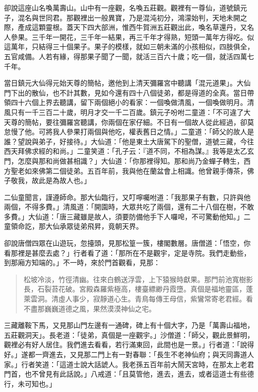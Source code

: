 卻說這座山名喚萬壽山。山中有一座觀，名喚五莊觀。觀裡有一尊仙，道號鎮元子，混名與世同君。那觀裡出一般異寶，乃是混沌初分，鴻濛始判，天地未開之際，產成這顆靈根。蓋天下四大部洲，惟西牛賀洲五莊觀出此，喚名草還丹，又名人參果。三千年一開花，三千年一結果，再三千年才得熟，短頭一萬年方得吃。似這萬年，只結得三十個果子。果子的模樣，就如三朝未滿的小孩相似，四肢俱全，五官咸備。人若有緣，得那果子聞了一聞，就活三百六十歲；吃一個，就活四萬七千年。

當日鎮元大仙得元始天尊的簡帖，邀他到上清天彌羅宮中聽講「混元道果」。大仙門下出的散仙，也不計其數，見如今還有四十八個徒弟，都是得道的全真。當日帶領四十六個上界去聽講，留下兩個絕小的看家：一個喚做清風，一個喚做明月。清風只有一千三百二十歲，明月才交一千二百歲。鎮元子吩咐二童道：「不可違了大天尊的簡帖，要往彌羅宮聽講，你兩個在家仔細。不日有一個故人從此經過，卻莫怠慢了他。可將我人參果打兩個與他吃，權表舊日之情。」二童道：「師父的故人是誰？望說與弟子，好接待。」大仙道：「他是東土大唐駕下的聖僧，道號三藏，今往西天拜佛求經的和尚。」二童笑道：「孔子云：『道不同，不相為謀。』我等是太乙玄門，怎麼與那和尚做甚相識？」大仙道：「你那裡得知。那和尚乃金蟬子轉生，西方聖老如來佛第二個徒弟。五百年前，我與他在蘭盆會上相識。他曾親手傳茶，佛子敬我，故此是為故人也。」

二仙童聞言，謹遵師命。那大仙臨行，又叮嚀囑咐道：「我那果子有數，只許與他兩個，不得多費。」清風道：「開園時，大眾共吃了兩個，還有二十八個在樹，不敢多費。」大仙道：「唐三藏雖是故人，須要防備他手下人囉唣，不可驚動他知。」二童領命訖，那大仙承眾徒弟飛昇，竟朝天界。

卻說唐僧四眾在山遊玩，忽擡頭，見那松篁一簇，樓閣數層。唐僧道：「悟空，你看那裡是甚麼去處？」行者看了道：「那所在不是觀宇，定是寺院。我們走動些，到那廂方知端的。」不一時，來於門首觀看，見那：
\begin{quote}
松坡冷淡，竹徑清幽。往來白鶴送浮雲，上下猿猴時獻果。那門前池寬樹影長，石裂苔花破。宮殿森羅紫極高，樓臺縹緲丹霞墮。真個是福地靈區，蓬萊雲洞。清虛人事少，寂靜道心生。青鳥每傳王母信，紫鸞常寄老君經。看不盡那巍巍道德之風，果然漠漠神仙之宅。
\end{quote}

三藏離鞍下馬，又見那山門左邊有一通碑，碑上有十個大字，乃是「萬壽山福地，五莊觀洞天」。長老道：「徒弟，真個是一座觀宇。」沙僧道：「師父，觀此景鮮明，觀裡必有好人居住。我們進去看看，若行滿東回，此間也是一景。」行者道：「說得好。」遂都一齊進去，又見那二門上有一對春聯：「長生不老神仙府；與天同壽道人家。」行者笑道：「這道士說大話諕人。我老孫五百年前大鬧天宮時，在那太上老君門首，也不曾見有此話說。」八戒道：「且莫管他，進去，進去，或者這道士有些德行，未可知也。」


